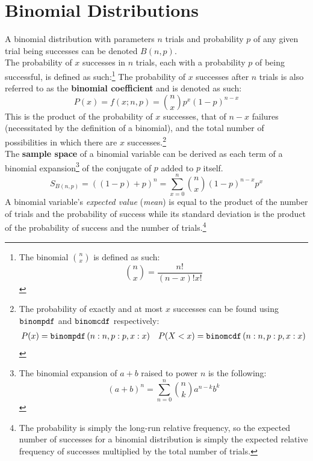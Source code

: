 \documentclass[../AP_Statistics.tex]{subfiles}
\begin{document}
		\section{Binomial Distributions}
			A binomial distribution with parameters $n$ trials and probability $p$ of any given trial being successes can be denoted $B(n, p)$. \\
			The probability of $x$ successes in $n$ trials, each with a probability $p$ of being successful, is defined as such:\footnote{The binomial $\binom{n}{x}$ is defined as such:\[\binom{n}{x} = \frac{n!}{(n - x)!x!}\]}
			The probability of $x$ successes after $n$ trials is also referred to as the \textbf{binomial coefficient} and is denoted as such:
			\[P(x) = f(x;n,p) = \binom{n}{x}p^x(1 - p)^{n - x}\]
			This is the product of the probability of $x$ successes, that of $n - x$ failures (necessitated by the definition of a binomial), and the total number of possibilities in which there are $x$ successes.\footnote{The probability of exactly and at most $x$ successes can be found using $\operatorname{\texttt{binompdf}}$ and $\operatorname{\texttt{binomcdf}}$ respectively:\begin{align*}P(x) = \operatorname{\texttt{binompdf}}\left(n:n, p:p, x:x\right) && P(X < x) = \operatorname{\texttt{binomcdf}}\left(n:n, p:p, x:x\right)\end{align*}} \\
			The \textbf{sample space} of a binomial variable can be derived as each term of a binomial expansion\footnote{The binomial expansion of $a + b$ raised to power $n$ is the following:\[(a + b)^n = \sum_{n = 0}^n\binom{n}{k}a^{n - k}b^k\]} of the conjugate of $p$ added to $p$ itself.
			\[S_{B(n, p)} = ((1 - p) + p)^n = \sum_{x = 0}^n\binom{n}{x}(1 - p)^{n - x}p^x\]
			A binomial variable's \emph{expected value} (\emph{mean}) is equal to the product of the number of trials and the probability of success while its standard deviation is the product of the probability of success and the number of trials.\footnote{The probability is simply the long-run relative frequency, so the expected number of successes for a binomial distribution is simply the expected relative frequency of successes multiplied by the total number of trials.}
\end{document}
